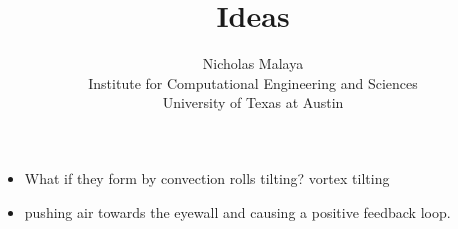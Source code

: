 \documentclass{article}
\title{\bf{Ideas}}
\author{Nicholas Malaya \\ Institute for Computational Engineering and Sciences \\ University of Texas at Austin} \date{}
\begin{document}
\maketitle

\newpage

\begin{itemize}
  \item What if they form by convection rolls tilting? vortex tilting
  \item pushing air towards the eyewall and causing a positive feedback loop.
\end{itemize}
\end{document}

